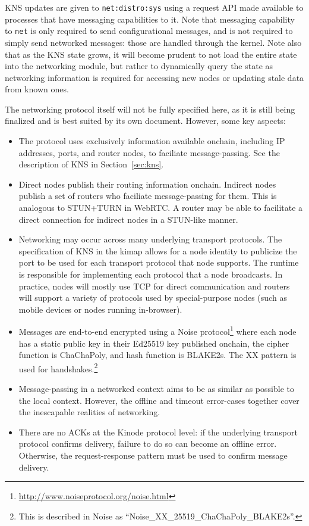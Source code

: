 \documentclass[runningheads]{llncs}
\begin{document}
KNS updates are given to \verb|net:distro:sys| using a request API made available to processes that have messaging capabilities to it.
Note that messaging capability to \verb|net| is only required to send configurational messages, and is not required to simply send networked messages: those are handled through the kernel.
Note also that as the KNS state grows, it will become prudent to not load the entire state into the networking module, but rather to dynamically query the state as networking information is required for accessing new nodes or updating stale data from known ones.

The networking protocol itself will not be fully specified here, as it is still being finalized and is best suited by its own document. However, some key aspects:

\begin{itemize}
    \item The protocol uses exclusively information available onchain, including IP addresses, ports, and router nodes, to faciliate message-passing.
    See the description of KNS in Section~\ref{sec:kns}.
    \item Direct nodes publish their routing information onchain.
    Indirect nodes publish a set of routers who faciliate message-passing for them.
    This is analogous to STUN+TURN in WebRTC.
    A router may be able to facilitate a direct connection for indirect nodes in a STUN-like manner.
    \item Networking may occur across many underlying transport protocols.
    The specification of KNS in the kimap allows for a node identity to publicize the port to be used for each transport protocol that node supports.
    The runtime is responsible for implementing each protocol that a node broadcasts.
    In practice, nodes will mostly use TCP for direct communication and routers will support a variety of protocols used by special-purpose nodes (such as mobile devices or nodes running in-browser).
    \item Messages are end-to-end encrypted using a Noise protocol\footnote{\url{http://www.noiseprotocol.org/noise.html}}
    where each node has a static public key in their Ed25519 key published onchain, the cipher function is ChaChaPoly, and hash function is BLAKE2s.
    The XX pattern is used for handshakes.\footnote{This is described in Noise as ``Noise\_XX\_25519\_ChaChaPoly\_BLAKE2s''.}
    \item Message-passing in a networked context aims to be as similar as possible to the local context.
    However, the offline and timeout error-cases together cover the inescapable realities of networking.
    \item There are no ACKs at the Kinode protocol level: if the underlying transport protocol confirms delivery, failure to do so can become an offline error.
    Otherwise, the request-response pattern must be used to confirm message delivery.
\end{itemize}
\end{document}
